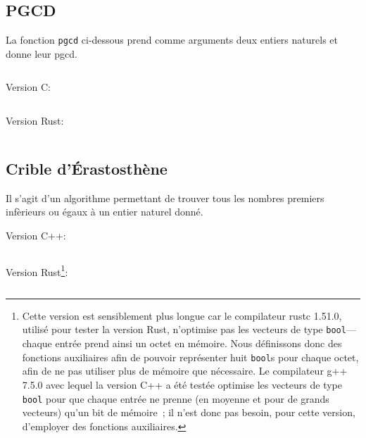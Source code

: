 \subsection{PGCD}
\label{app:Haskell_pgcd}

\noindent 
La fonction \texttt{pgcd} ci-dessous prend comme arguments deux entiers naturels et donne leur pgcd.

\vspace*{1ex}

\noindent
{}
\vspace*{-1ex}
\inputminted{Haskell}{Ensembles_Arithmétique/Code/pgcd.hs}

\medskip

\noindent Version C: 
\inputminted{C}{Ensembles_Arithmétique/Code/pgcd.c}

\medskip

\noindent Version Rust: 
\inputminted{Rust}{Ensembles_Arithmétique/Code/pgcd.rs}

\subsection{Crible d'Érastosthène}
\label{app:code_erastosthene}


Il s'agit d'un algorithme permettant de trouver tous les nombres premiers infèrieurs ou égaux à un entier naturel donné.

\bigskip

\noindent Version C++: 
\inputminted{C++}{Ensembles_Arithmétique/Code/Érastosthène.cpp}

\bigskip

\noindent Version Rust\footnote{
    Cette version est sensiblement plus longue car le compilateur rustc 1.51.0, utilisé pour tester la version Rust, n'optimise pas les vecteurs de type \texttt{bool}—chaque entrée prend ainsi un octet en mémoire. 
    Nous définissons donc des fonctions auxiliaires afin de pouvoir représenter huit \texttt{bool}s pour chaque octet, afin de ne pas utiliser plus de mémoire que nécessaire.
    Le compilateur g++ 7.5.0 avec lequel la version C++ a été testée optimise les vecteurs de type \texttt{bool} pour que chaque entrée ne prenne (en moyenne et pour de grands vecteurs) qu'un bit de mémoire ; il n'est donc pas besoin, pour cette version, d'employer des fonctions auxiliaires. 
}: 
\inputminted{Rust}{Ensembles_Arithmétique/Code/Érastosthène.rs}
